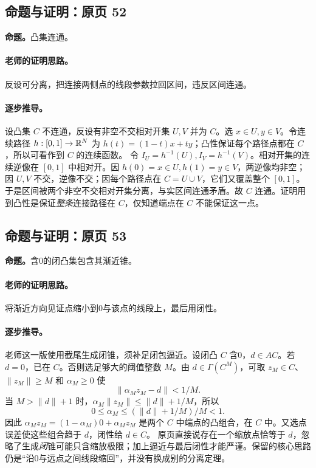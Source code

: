 \subsection{命题与证明：原页 52}

\textbf{命题。}凸集连通。

\paragraph{老师的证明思路。}反设可分离，把连接两侧点的线段参数拉回区间，违反区间连通。

\paragraph{逐步推导。}
设凸集 $C$ 不连通，反设有非空不交相对开集 $U,V$ 并为 $C$。选 $x\in U,y\in V$。令连续路径 $h:[0,1]\to\mathbb{R}^N$ 为 $h(t)=(1-t)x+ty$；凸性保证每个路径点都在 $C$，所以可看作到 $C$ 的连续函数。
令 $I_U=h^{-1}(U),I_V=h^{-1}(V)$。相对开集的连续逆像在 $[0,1]$ 中相对开。因 $h(0)=x\in U,h(1)=y\in V$，两逆像均非空；因 $U,V$ 不交，逆像不交；因每个路径点在 $C=U\cup V$，它们又覆盖整个 $[0,1]$。
于是区间被两个非空不交相对开集分离，与实区间连通矛盾。故 $C$ 连通。证明用到凸性是保证\emph{整条}连接路径在 $C$，仅知道端点在 $C$ 不能保证这一点。


\subsection{命题与证明：原页 53}

\textbf{命题。}含0的闭凸集包含其渐近锥。

\paragraph{老师的证明思路。}将渐近方向见证点缩小到0与该点的线段上，最后用闭性。

\paragraph{逐步推导。}
老师这一版使用截尾生成闭锥，须补足闭包逼近。设闭凸 $C$ 含0，$d\in AC$。若 $d=0$，已在 $C$。否则选足够大的阈值整数 $M$。由 $d\in\Gamma(C^M)$，可取 $z_M\in C$、$\|z_M\|\ge M$ 和 $\alpha_M\ge0$ 使
\[\|\alpha_Mz_M-d\|<1/M.\]
当 $M>\|d\|+1$ 时，$\alpha_M\|z_M\|\le\|d\|+1/M$，所以
\[0\le\alpha_M\le(\|d\|+1/M)/M<1.\]
因此 $\alpha_Mz_M=(1-\alpha_M)0+\alpha_Mz_M$ 是两个 $C$ 中端点的凸组合，在 $C$ 中。又选点误差使这些组合趋于 $d$，闭性给 $d\in C$。
原页直接说存在一个缩放点恰等于 $d$，忽略了生成\emph{闭}锥可能只含缩放极限；加上逼近与最后闭性才能严谨。保留的核心思路仍是“沿0与远点之间线段缩回”，并没有换成别的分离定理。


